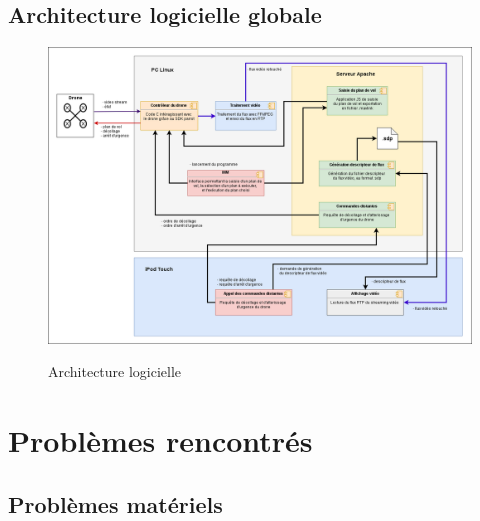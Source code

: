 \documentclass{article}
\begin{document}
    \newpage
	
	\subsection{Architecture logicielle globale}
	    \vspace*{0.3cm}
	    \begin{center}
		\begin{figure}[!h]
		\includegraphics[scale=0.4]{04_archi_logicielle_complete.png}\\
		\caption{Architecture logicielle}
		\end{figure}
        \end{center}
		
\newpage
\section{Problèmes rencontrés}
	\subsection{Problèmes matériels}
	
\end{document}
